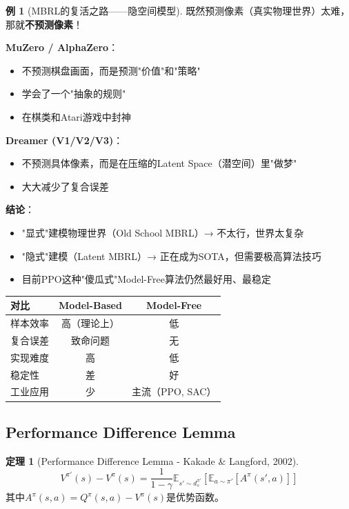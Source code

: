 \documentclass[11pt,a4paper]{article}
\theoremstyle{definition}
\newtheorem{example}{例}[section]
\newtheorem{theorem}{定理}[section]
\begin{document}
\begin{example}[MBRL的复活之路——隐空间模型]
既然预测像素（真实物理世界）太难，那就\textbf{不预测像素}！

\textbf{MuZero / AlphaZero}：
\begin{itemize}
    \item 不预测棋盘画面，而是预测"价值"和"策略"
    \item 学会了一个"抽象的规则"
    \item 在棋类和Atari游戏中封神
\end{itemize}

\textbf{Dreamer (V1/V2/V3)}：
\begin{itemize}
    \item 不预测具体像素，而是在压缩的Latent Space（潜空间）里"做梦"
    \item 大大减少了复合误差
\end{itemize}

\textbf{结论}：
\begin{itemize}
    \item "显式"建模物理世界（Old School MBRL）→ 不太行，世界太复杂
    \item "隐式"建模（Latent MBRL）→ 正在成为SOTA，但需要极高算法技巧
    \item 目前PPO这种"傻瓜式"Model-Free算法仍然最好用、最稳定
\end{itemize}
\end{example}

\begin{center}
\begin{tabular}{l|c|c}
\toprule
\textbf{对比} & \textbf{Model-Based} & \textbf{Model-Free} \\
\midrule
样本效率 & 高（理论上） & 低 \\
复合误差 & 致命问题 & 无 \\
实现难度 & 高 & 低 \\
稳定性 & 差 & 好 \\
工业应用 & 少 & 主流（PPO, SAC） \\
\bottomrule
\end{tabular}
\end{center}

\subsection{Performance Difference Lemma}

\begin{theorem}[Performance Difference Lemma - Kakade \& Langford, 2002]
\[
V^{\pi'}(s) - V^\pi(s) = \frac{1}{1-\gamma} \mathbb{E}_{s' \sim d^{\pi'}_s}\left[\mathbb{E}_{a \sim \pi'}[A^\pi(s', a)]\right]
\]
其中$A^\pi(s,a) = Q^\pi(s,a) - V^\pi(s)$是优势函数。
\end{theorem}
\end{document}
